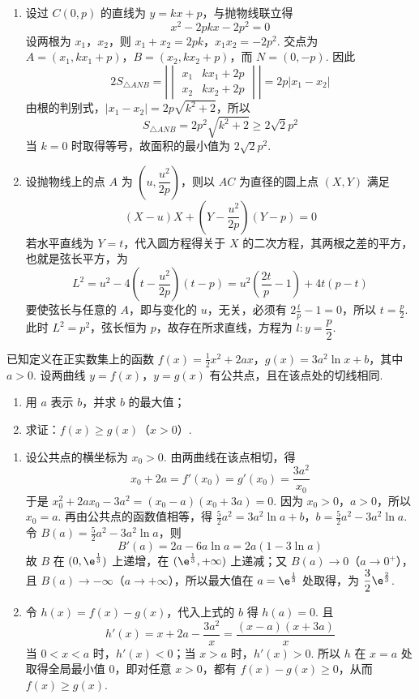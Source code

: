 \begin{solution}
\begin{enumerate}
\item 设过 \(C(0,p)\) 的直线为 \(y=kx+p\)，与抛物线联立得
\[
x^2-2pkx-2p^2=0
\]
设两根为 \(x_1\)，\(x_2\)，则 \(x_1+x_2=2pk\)，\(x_1x_2=-2p^2\). 交点为 \(A=(x_1,kx_1+p)\)，\(B=(x_2,kx_2+p)\)，而 \(N=(0,-p)\). 因此
\[
2S_{\triangle ANB}=\left|\begin{vmatrix}x_1&kx_1+2p\\x_2&kx_2+2p\end{vmatrix}\right|=2p|x_1-x_2|
\]
由根的判别式，\(|x_1-x_2|=2p\sqrt{k^2+2}\)，所以
\[
S_{\triangle ANB}=2p^2\sqrt{k^2+2}\geqslant2\sqrt2p^2
\]
当 \(k=0\) 时取得等号，故面积的最小值为 \(2\sqrt2p^2\).
\item 设抛物线上的点 \(A\) 为 \(\left(u,\dfrac{u^2}{2p}\right)\)，则以 \(AC\) 为直径的圆上点 \((X,Y)\) 满足
\[
(X-u)X+\left(Y-\frac{u^2}{2p}\right)(Y-p)=0
\]
若水平直线为 \(Y=t\)，代入圆方程得关于 \(X\) 的二次方程，其两根之差的平方，也就是弦长平方，为
\[
L^2=u^2-4\left(t-\frac{u^2}{2p}\right)(t-p)=u^2\left(\frac{2t}{p}-1\right)+4t(p-t)
\]
要使弦长与任意的 \(A\)，即与变化的 \(u\)，无关，必须有 \(2\frac{t}{p}-1=0\)，所以 \(t=\frac{p}{2}\). 此时 \(L^2=p^2\)，弦长恒为 \(p\)，故存在所求直线，方程为 \(l:y=\dfrac p2\).
\end{enumerate}
\end{solution}

\begin{problem}
已知定义在正实数集上的函数 \(f(x) = \frac{1}{2}x^2 + 2ax\)，\(g(x) = 3a^2\ln x + b\)，其中 \(a > 0\). 设两曲线 \(y = f(x)\)，\(y = g(x)\) 有公共点，且在该点处的切线相同.

\begin{enumerate}
\item 用 \(a\) 表示 \(b\)，并求 \(b\) 的最大值；
\item 求证：\(f(x) \geqslant g(x)\)（\(x > 0\)）.
\end{enumerate}
\end{problem}

\begin{solution}
\begin{enumerate}
\item 设公共点的横坐标为 \(x_0>0\). 由两曲线在该点相切，得
\[
x_0+2a=f'(x_0)=g'(x_0)=\frac{3a^2}{x_0}
\]
于是 \(x_0^2+2ax_0-3a^2=(x_0-a)(x_0+3a)=0\). 因为 \(x_0>0\)，\(a>0\)，所以 \(x_0=a\). 再由公共点的函数值相等，得
\(\frac52a^2=3a^2\ln a+b\)，\(b=\frac52a^2-3a^2\ln a\).
令 \(B(a)=\frac52a^2-3a^2\ln a\)，则
\[
B'(a)=2a-6a\ln a=2a(1-3\ln a)
\]
故 \(B\) 在 \((0,\e^{\frac{1}{3}})\) 上递增，在 \((\e^{\frac{1}{3}},+\infty)\) 上递减；又 \(B(a)\to0\)（\(a\to0^+\)），且 \(B(a)\to-\infty\)（\(a\to+\infty\)），所以最大值在 \(a=\e^{\frac{1}{3}}\) 处取得，为 \(\dfrac32\e^{\frac{2}{3}}\).
\item 令 \(h(x)=f(x)-g(x)\)，代入上式的 \(b\) 得 \(h(a)=0\). 且
\[
h'(x)=x+2a-\frac{3a^2}{x}=\frac{(x-a)(x+3a)}{x}
\]
当 \(0<x<a\) 时，\(h'(x)<0\)；当 \(x>a\) 时，\(h'(x)>0\). 所以 \(h\) 在 \(x=a\) 处取得全局最小值 \(0\)，即对任意 \(x>0\)，都有 \(f(x)-g(x)\geqslant0\)，从而 \(f(x)\geqslant g(x)\).
\end{enumerate}
\end{solution}

